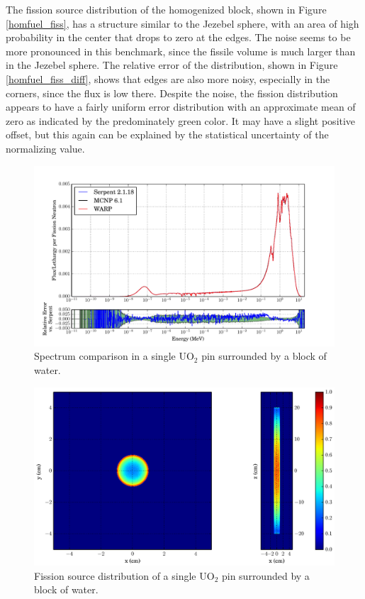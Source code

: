 The fission source distribution of the homogenized block, shown in Figure \ref{homfuel_fiss}, has a structure similar to the Jezebel sphere, with an area of high probability in the center that drops to zero at the edges.  The noise seems to be more pronounced in this benchmark, since the fissile volume is much larger than in the Jezebel sphere.  The relative error of the distribution, shown in Figure \ref{homfuel_fiss_diff}, shows that edges are also more noisy, especially in the corners, since the flux is low there.  Despite the noise, the fission distribution appears to have a fairly uniform error distribution with an approximate mean of zero as indicated by the predominately green color.  It may have a slight positive offset, but this again can be explained by the statistical uncertainty of the normalizing value.

\begin{figure}[h!] 
\centering
\includegraphics[width=\textwidth,trim= 1cm 0cm 1cm 0cm]{graphics/finalresults/pincell_spec-6.pdf}
\caption{Spectrum comparison in a single UO$_2$ pin surrounded by a block of water. \label{pincell_spec} }
\end{figure}

\begin{figure}[h!]
\centering
\includegraphics[width=\textwidth,trim= 11cm 0cm 6cm 0cm]{graphics/finalresults/pincell_fiss-6.eps}
\caption{Fission source distribution of a single UO$_2$ pin surrounded by a block of water. \label{pincell_fiss} }
\end{figure}

